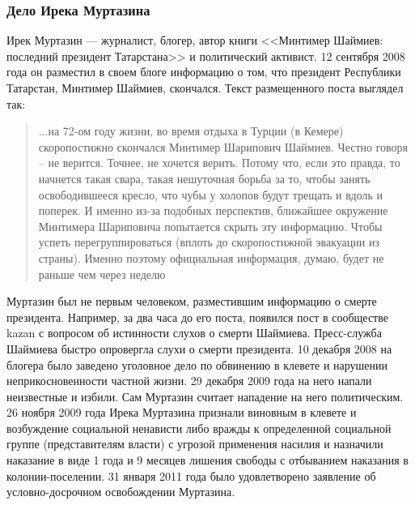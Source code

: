 \subsubsection{Дело Ирека Муртазина}
Ирек Муртазин --- журналист, блогер, автор книги <<Минтимер Шаймиев: последний президент Татарстана>> и политический активист. 12 сентября 2008 года он разместил в своем блоге информацию о том, что президент Республики Татарстан, Минтимер Шаймиев, скончался. Текст размещенного поста выглядел так\cite{murtazin_post}:
\begin{quote}...на 72-ом году жизни, во время отдыха в Турции (в  Кемере) скоропостижно скончался Минтимер Шарипович Шаймиев.
Честно говоря – не верится. Точнее, не хочется верить. Потому что, если это правда, то начнется такая свара, такая нешуточная борьба за то, чтобы занять освободившееся кресло, что чубы у холопов будут трещать и вдоль и поперек. И именно из-за подобных перспектив, ближайшее окружение Минтимера Шариповича попытается скрыть эту информацию. Чтобы успеть перегруппироваться (вплоть до скоропостижной эвакуации из страны). Именно поэтому официальная информация, думаю, будет не раньше чем через неделю\end{quote}
Муртазин был не первым человеком, разместившим информацию о смерте президента. Например, за два часа до его поста, появился пост в сообществе kazan с вопросом об истинности слухов о смерти Шаймиева\cite{murtazin_later}. Пресс-служба Шаймиева быстро опровергла слухи о смерти президента\cite{murtazin_alive}. 10 декабря 2008 на блогера было заведено уголовное дело по обвинению в клевете и нарушении неприкосновенности частной жизни\cite{murtazin_delo}. 29 декабря 2009 года на него напали неизвестные и избили\cite{murtazin_beat}. Сам Муртазин считает нападение на него политическим\cite{murtazin_political}. 26 ноября 2009 года Ирека Муртазина признали виновным в клевете и возбуждение социальной ненависти либо вражды к определенной социальной группе (представителям власти\cite{murtazin_group}) с угрозой применения насилия и назначили наказание в виде 1 года и 9 месяцев лишения свободы с отбыванием наказания в колонии-поселении\cite{murtazin_court}. 31 января 2011 года было удовлетворено заявление об условно-досрочном освобождении Муртазина\cite{murtazin_free}.
